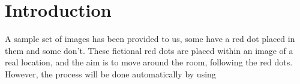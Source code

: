 \section{Introduction}
\label{sec:intro}

A sample set of images has been provided to us, some have a red dot placed in them and some don't. These fictional red dots are placed within an image of a real location, and the aim is to move around the room, following the red dots. However, the process will be done automatically by using 
\cite{lecun1989backpropagation}
\cite{zeiler2014visualizing}




